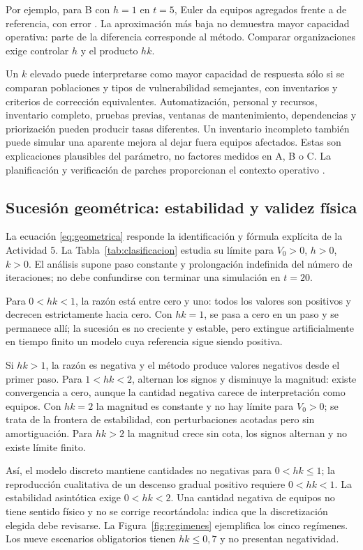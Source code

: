 \documentclass[11pt,a4paper]{article}
\begin{document}
Por ejemplo, para B con $h=1$ en $t=5$, Euler da \BcincoEuler{} equipos agregados frente a \BcincoRef{} de referencia, con error \BcincoError{}. La aproximación más baja no demuestra mayor capacidad operativa: parte de la diferencia corresponde al método. Comparar organizaciones exige controlar $h$ y el producto $hk$.

Un $k$ elevado puede interpretarse como mayor capacidad de respuesta sólo si se comparan poblaciones y tipos de vulnerabilidad semejantes, con inventarios y criterios de corrección equivalentes. Automatización, personal y recursos, inventario completo, pruebas previas, ventanas de mantenimiento, dependencias y priorización pueden producir tasas diferentes. Un inventario incompleto también puede simular una aparente mejora al dejar fuera equipos afectados. Estas son explicaciones plausibles del parámetro, no factores medidos en A, B o C. La planificación y verificación de parches proporcionan el contexto operativo \parencite{nist}.

\subsection{Sucesión geométrica: estabilidad y validez física}
La ecuación \ref{eq:geometrica} responde la identificación y fórmula explícita de la Actividad 5. La Tabla~\ref{tab:clasificacion} estudia su límite para $V_0>0$, $h>0$, $k>0$. El análisis supone paso constante y prolongación indefinida del número de iteraciones; no debe confundirse con terminar una simulación en $t=20$.

Para $0<hk<1$, la razón está entre cero y uno: todos los valores son positivos y decrecen estrictamente hacia cero. Con $hk=1$, se pasa a cero en un paso y se permanece allí; la sucesión es no creciente y estable, pero extingue artificialmente en tiempo finito un modelo cuya referencia sigue siendo positiva.

Si $hk>1$, la razón es negativa y el método produce valores negativos desde el primer paso. Para $1<hk<2$, alternan los signos y disminuye la magnitud: existe convergencia a cero, aunque la cantidad negativa carece de interpretación como equipos. Con $hk=2$ la magnitud es constante y no hay límite para $V_0>0$; se trata de la frontera de estabilidad, con perturbaciones acotadas pero sin amortiguación. Para $hk>2$ la magnitud crece sin cota, los signos alternan y no existe límite finito.

Así, el modelo discreto mantiene cantidades no negativas para $0<hk\le1$; la reproducción cualitativa de un descenso gradual positivo requiere $0<hk<1$. La estabilidad asintótica exige $0<hk<2$. Una cantidad negativa de equipos no tiene sentido físico y no se corrige recortándola: indica que la discretización elegida debe revisarse. La Figura~\ref{fig:regimenes} ejemplifica los cinco regímenes. Los nueve escenarios obligatorios tienen $hk\le0,7$ y no presentan negatividad.
\end{document}
